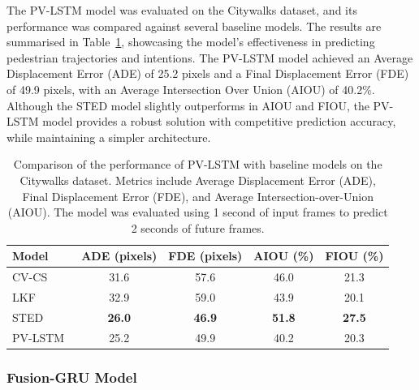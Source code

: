 \documentclass[12pt,oneside]{book} %
\begin{document}
The PV-LSTM model was evaluated on the Citywalks dataset, and its performance
was compared against several baseline models. The results are summarised in
Table~\ref{tab:pv-lstm-results}, showcasing the model's effectiveness in
predicting pedestrian trajectories and intentions. The PV-LSTM model achieved
an Average Displacement Error (ADE) of 25.2 pixels and a Final Displacement
Error (FDE) of 49.9 pixels, with an Average Intersection Over Union (AIOU) of
40.2\%. Although the STED model slightly outperforms in AIOU and FIOU, the
PV-LSTM model provides a robust solution with competitive prediction accuracy,
while maintaining a simpler architecture.

\begin{table}[H]
    \centering
    \caption{Comparison of the performance of PV-LSTM with baseline models on the Citywalks dataset. Metrics include Average Displacement Error (ADE), Final Displacement Error (FDE), and Average Intersection-over-Union (AIOU). The model was evaluated using 1 second of input frames to predict 2 seconds of future frames.}
    \begin{adjustbox}{max width=\textwidth}
        \begin{tabular}{lcccc}
            \toprule
            \textbf{Model}                                   & \textbf{ADE (pixels)} & \textbf{FDE (pixels)} & \textbf{AIOU (\%)} & \textbf{FIOU (\%)} \\ 
            \midrule
            CV-CS~\cite{DBLP:journals/corr/abs-2010-10270}   & 31.6                  & 57.6                  & 46.0               & 21.3               \\
            LKF~\cite{DBLP:journals/corr/abs-2010-10270}     & 32.9                  & 59.0                  & 43.9               & 20.1               \\
            STED~\cite{DBLP:journals/corr/abs-2010-10270}    & \textbf{26.0}         & \textbf{46.9}         & \textbf{51.8}      & \textbf{27.5}      \\
            PV-LSTM~\cite{DBLP:journals/corr/abs-2010-10270} & 25.2                  & 49.9                  & 40.2               & 20.3               \\
            \bottomrule
        \end{tabular}
    \end{adjustbox}
    \label{tab:pv-lstm-results}
\end{table}

\subsubsection{Fusion-GRU Model}
\end{document}
